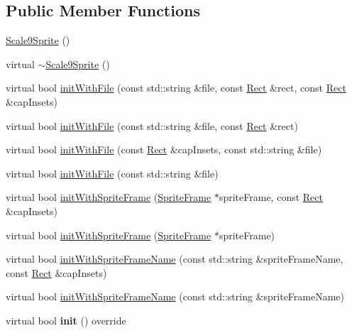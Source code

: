 \subsection*{Public Member Functions}
\begin{DoxyCompactItemize}
\item 
\hyperlink{classui_1_1Scale9Sprite_aec8b65903ec8cbb40857592d2b4c49a8}{Scale9\+Sprite} ()
\item 
virtual \hyperlink{classui_1_1Scale9Sprite_a3461124bef5eff5d65cf265e81174502}{$\sim$\+Scale9\+Sprite} ()
\item 
virtual bool \hyperlink{classui_1_1Scale9Sprite_a1b7903df8f252e3e7d67d77cc5a1a76e}{init\+With\+File} (const std\+::string \&file, const \hyperlink{classRect}{Rect} \&rect, const \hyperlink{classRect}{Rect} \&cap\+Insets)
\item 
virtual bool \hyperlink{classui_1_1Scale9Sprite_a33ee4d10ad6015a645f701ddfa2ab4d7}{init\+With\+File} (const std\+::string \&file, const \hyperlink{classRect}{Rect} \&rect)
\item 
virtual bool \hyperlink{classui_1_1Scale9Sprite_ae99c2fd664a255ea788cfc9d22ece8ac}{init\+With\+File} (const \hyperlink{classRect}{Rect} \&cap\+Insets, const std\+::string \&file)
\item 
virtual bool \hyperlink{classui_1_1Scale9Sprite_ad3e4f907faf79e406320c10ca0785a39}{init\+With\+File} (const std\+::string \&file)
\item 
virtual bool \hyperlink{classui_1_1Scale9Sprite_ade227fd72fa88fc071803260cac0d9b5}{init\+With\+Sprite\+Frame} (\hyperlink{classSpriteFrame}{Sprite\+Frame} $\ast$sprite\+Frame, const \hyperlink{classRect}{Rect} \&cap\+Insets)
\item 
virtual bool \hyperlink{classui_1_1Scale9Sprite_a77f0c229307f987be75ebad959cb2b18}{init\+With\+Sprite\+Frame} (\hyperlink{classSpriteFrame}{Sprite\+Frame} $\ast$sprite\+Frame)
\item 
virtual bool \hyperlink{classui_1_1Scale9Sprite_ac98b54d7b54f54fd667d47178dedd34f}{init\+With\+Sprite\+Frame\+Name} (const std\+::string \&sprite\+Frame\+Name, const \hyperlink{classRect}{Rect} \&cap\+Insets)
\item 
virtual bool \hyperlink{classui_1_1Scale9Sprite_ac28a73f9652a1bffc597085b06087dda}{init\+With\+Sprite\+Frame\+Name} (const std\+::string \&sprite\+Frame\+Name)
\item 
\mbox{\label{classui_1_1Scale9Sprite_abf8116270ce81aa571dd687277844b85}} 
virtual bool {\bfseries init} () override

\end{DoxyCompactItemize}
